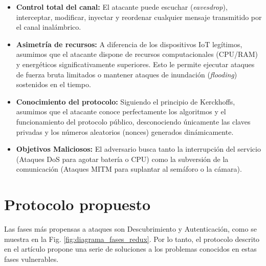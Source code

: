 \documentclass[conference,a4paper,onecolumn,11pt]{IEEEtran} %
\begin{document}
\begin{itemize}
    \item \textbf{Control total del canal:} El atacante puede escuchar (\textit{eavesdrop}), interceptar, modificar, inyectar y reordenar cualquier mensaje transmitido por el canal inalámbrico.
    
    \item \textbf{Asimetría de recursos:} A diferencia de los dispositivos IoT legítimos, asumimos que el atacante dispone de recursos computacionales (CPU/RAM) y energéticos significativamente superiores. Esto le permite ejecutar ataques de fuerza bruta limitados o mantener ataques de inundación (\textit{flooding}) sostenidos en el tiempo.
    
    \item \textbf{Conocimiento del protocolo:} Siguiendo el principio de Kerckhoffs, asumimos que el atacante conoce perfectamente los algoritmos y el funcionamiento del protocolo público, desconociendo únicamente las claves privadas y los números aleatorios (nonces) generados dinámicamente.
    
    \item \textbf{Objetivos Maliciosos:} El adversario busca tanto la interrupción del servicio (Ataques DoS para agotar batería o CPU) como la subversión de la comunicación (Ataques MITM para suplantar al semáforo o la cámara).
\end{itemize}

\section{Protocolo propuesto}
Las fases más propensas a ataques son Descubrimiento y Autenticación, como se muestra en la Fig. \ref{fig:diagrama_fases_redux}. Por lo tanto, el protocolo descrito en el artículo propone una serie de soluciones a los problemas conocidos en estas fases vulnerables.
\end{document}
